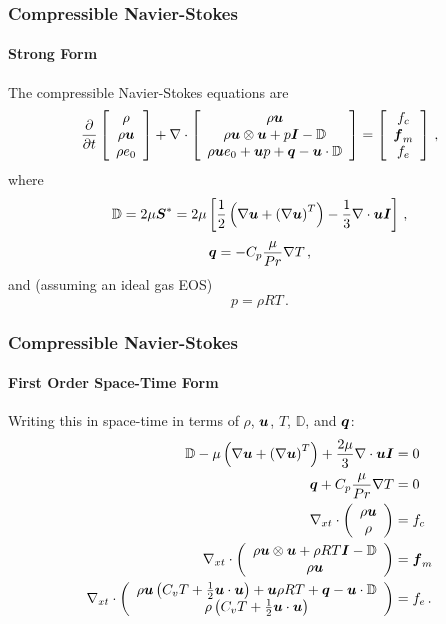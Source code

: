 \documentclass[18pt,xcolor=table]{beamer}
\begin{document}
\begin{frame}[t]
\frametitle{Compressible Navier-Stokes}
\framesubtitle{Strong Form}  %
The compressible Navier-Stokes equations are
\begin{align*}
\frac{\partial}{\partial t}\left[ \begin{array}{c} \rho\\ \rho\boldsymbol u\\ \rho e_0\\ \end{array} \right]
+\nabla\cdot\left[ \begin{array}{c} \rho\boldsymbol u\\ \rho\boldsymbol u\otimes\boldsymbol u+p\boldsymbol I-\mathbb{D}\\ \rho\boldsymbol u e_0+\boldsymbol u p+\boldsymbol q-\boldsymbol u\cdot\mathbb{D}\\ \end{array} \right]
=\left[ \begin{array}{c} f_c\\ \boldsymbol f_m\\ f_e\\ \end{array} \right]\,,
\end{align*}
where
\begin{equation*}
  \mathbb{D}=2\mu\boldsymbol S^*=2\mu\left[ \frac{1}{2}\left( \nabla\boldsymbol u+\left( \nabla\boldsymbol u \right)^T \right)-\frac{1}{3}\nabla\cdot\boldsymbol u\boldsymbol I \right]\,,
\end{equation*}
\begin{equation*}
  \boldsymbol q=-C_p\frac{\mu}{Pr}\nabla T\,,
\end{equation*}
and (assuming an ideal gas EOS)
\[
p=\rho R T\,.
\]
\end{frame}

\begin{frame}[t]
\frametitle{Compressible Navier-Stokes}
\framesubtitle{First Order Space-Time Form}  %
Writing this in space-time in terms of $\rho$, $\boldsymbol u$, $T$, $\mathbb{D}$, and $\boldsymbol q$:
\begin{align*}
  \mathbb{D}-\mu\left( \nabla\boldsymbol u+\left( \nabla\boldsymbol u \right)^T \right)+\frac{2\mu}{3}\nabla\cdot\boldsymbol u\boldsymbol I&=0\\
  \boldsymbol q+C_p\frac{\mu}{Pr}\nabla T&=0\\
  \nabla_{xt}\cdot\left( \begin{array}{c} \rho\boldsymbol u\\ \rho\\ \end{array} \right)&=f_c\\
  \nabla_{xt}\cdot\left( \begin{array}{c} \rho\boldsymbol u\otimes\boldsymbol u+\rho RT\boldsymbol I-\mathbb{D}\\ \rho\boldsymbol u\\ \end{array} \right)&=\boldsymbol f_m\\
  \nabla_{xt}\cdot\left( \begin{array}{c} \rho\boldsymbol u\left( C_v T+\frac{1}{2}\boldsymbol u\cdot\boldsymbol u \right)+\boldsymbol u\rho RT+\boldsymbol q-\boldsymbol u\cdot\mathbb{D}\\ \rho\left( C_v T+\frac{1}{2}\boldsymbol u\cdot\boldsymbol u \right)\\ \end{array} \right)&=f_e\,.
\end{align*}
\end{frame}
\end{document}

